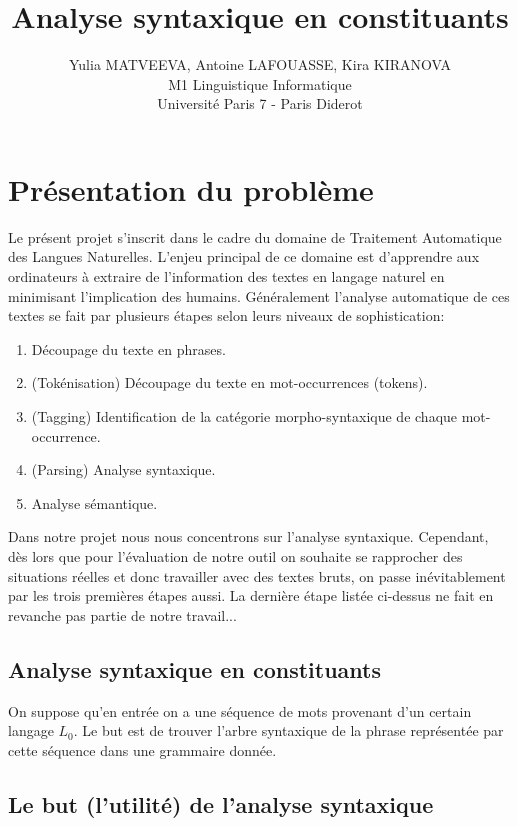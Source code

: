 \documentclass[12pt]{article}
\begin{document}
\title{Analyse syntaxique en constituants}
\author{Yulia MATVEEVA, Antoine LAFOUASSE, Kira KIRANOVA\\
M1 Linguistique Informatique\\
Université Paris 7 - Paris Diderot}
\date{}
\maketitle

\section{Présentation du problème}

Le pr\'esent projet s'inscrit dans le cadre du domaine de Traitement Automatique
des Langues Naturelles. L'enjeu principal de ce domaine est d'apprendre aux ordinateurs  \`a extraire de l'information des textes en langage naturel en minimisant l'implication des humains. G\'en\'eralement l'analyse automatique de ces textes se fait par plusieurs \'etapes selon leurs niveaux de sophistication:
\begin{enumerate}
\item Découpage du texte en phrases.
\item (Tokénisation) Découpage du texte en mot-occurrences (tokens).
\item (Tagging) Identification de la catégorie morpho-syntaxique de chaque
mot-occurrence.
\item (Parsing) Analyse syntaxique.
\item Analyse sémantique.
\end{enumerate}

Dans notre projet nous nous concentrons sur l'analyse syntaxique. Cependant, d\`es lors que pour l'\'evaluation de notre outil on souhaite se rapprocher des situations r\'eelles et donc travailler avec des textes bruts, on passe in\'evitablement par les trois premi\`eres \'etapes aussi. La derni\`ere \'etape list\'ee ci-dessus ne fait en revanche pas partie de notre travail...

\subsection{Analyse syntaxique en constituants}
 On suppose qu'en entrée on a une séquence de mots provenant d'un certain
 langage $L_0$. Le but est de trouver l'arbre syntaxique de la phrase
 représentée par cette séquence dans une grammaire donnée.

\subsection{Le but (l'utilité) de l'analyse syntaxique}
\end{document}
